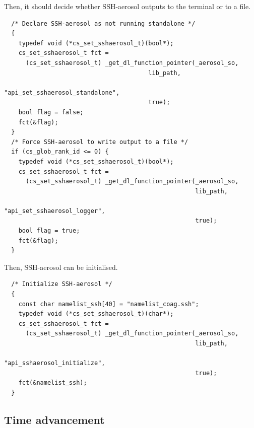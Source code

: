 \documentclass[a4paper,11pt]{article}
\begin{document}
Then, it should decide whether SSH-aerosol outputs to the terminal or to a file.
\begin{verbatim}
  /* Declare SSH-aerosol as not running standalone */
  {
    typedef void (*cs_set_sshaerosol_t)(bool*);
    cs_set_sshaerosol_t fct =
      (cs_set_sshaerosol_t) _get_dl_function_pointer(_aerosol_so,
                                        lib_path,
                                        "api_set_sshaerosol_standalone",
                                        true);
    bool flag = false;
    fct(&flag);
  }
  /* Force SSH-aerosol to write output to a file */
  if (cs_glob_rank_id <= 0) {
    typedef void (*cs_set_sshaerosol_t)(bool*);
    cs_set_sshaerosol_t fct =
      (cs_set_sshaerosol_t) _get_dl_function_pointer(_aerosol_so,
                                                     lib_path,
                                                    "api_set_sshaerosol_logger",
                                                     true);
    bool flag = true;
    fct(&flag);
  }
\end{verbatim}

Then, SSH-aerosol can be initialised.
\begin{verbatim}
  /* Initialize SSH-aerosol */
  {
    const char namelist_ssh[40] = "namelist_coag.ssh";
    typedef void (*cs_set_sshaerosol_t)(char*);
    cs_set_sshaerosol_t fct =
      (cs_set_sshaerosol_t) _get_dl_function_pointer(_aerosol_so,
                                                     lib_path,
                                                    "api_sshaerosol_initialize",
                                                     true);
    fct(&namelist_ssh);
  }
\end{verbatim}

\subsection*{Time advancement}
\end{document}
